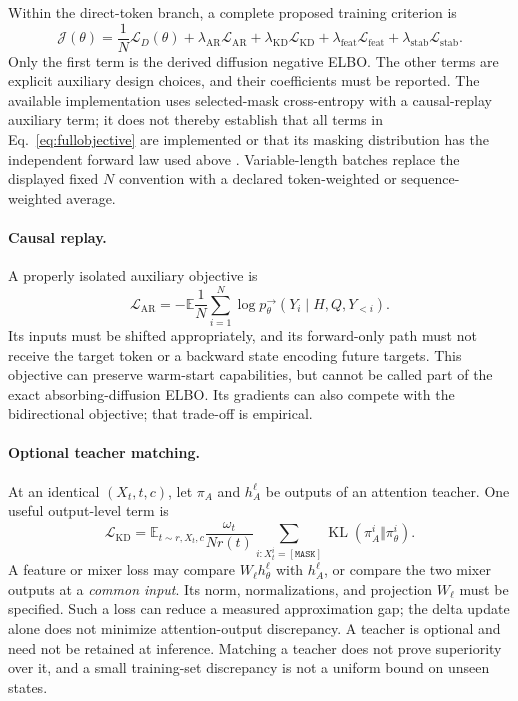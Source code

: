 \documentclass{article}
\theoremstyle{remark}\newtheorem{remark}[theorem]{Remark}
\newcommand{\E}{\mathbb E}
\newcommand{\KL}{\operatorname{KL}}
\newcommand{\mask}{\mathtt{[MASK]}}
\begin{document}
Within the direct-token branch, a complete proposed training criterion is
\begin{equation}
 \mathcal J(\theta)=\frac{1}{N}\mathcal L_D(\theta)
 +\lambda_{\mathrm{AR}}\mathcal L_{\mathrm{AR}}
 +\lambda_{\mathrm{KD}}\mathcal L_{\mathrm{KD}}
 +\lambda_{\mathrm{feat}}\mathcal L_{\mathrm{feat}}
 +\lambda_{\mathrm{stab}}\mathcal L_{\mathrm{stab}}.
 \label{eq:fullobjective}
\end{equation}
Only the first term is the derived diffusion negative ELBO. The other terms are explicit auxiliary design choices, and their coefficients must be reported. The available implementation uses selected-mask cross-entropy with a causal-replay auxiliary term; it does not thereby establish that all terms in Eq.~\eqref{eq:fullobjective} are implemented or that its masking distribution has the independent forward law used above \cite{repo}. Variable-length batches replace the displayed fixed $N$ convention with a declared token-weighted or sequence-weighted average.

\paragraph{Causal replay.}
A properly isolated auxiliary objective is
\begin{equation}
 \mathcal L_{\mathrm{AR}}=-\E\frac1N\sum_{i=1}^N
 \log p_\theta^{\to}(Y_i\mid H,Q,Y_{<i}).
\end{equation}
Its inputs must be shifted appropriately, and its forward-only path must not receive the target token or a backward state encoding future targets. This objective can preserve warm-start capabilities, but cannot be called part of the exact absorbing-diffusion ELBO. Its gradients can also compete with the bidirectional objective; that trade-off is empirical.

\paragraph{Optional teacher matching.}
At an identical $(X_t,t,c)$, let $\pi_A$ and $h_A^\ell$ be outputs of an attention teacher. One useful output-level term is
\begin{equation}
 \mathcal L_{\mathrm{KD}}=\E_{t\sim r,X_t,c}\frac{\omega_t}{Nr(t)}
 \sum_{i:X_t^i=\mask}\KL(\pi_A^i\Vert\pi_\theta^i).
 \label{eq:distillation}
\end{equation}
A feature or mixer loss may compare $W_\ell h_\theta^\ell$ with $h_A^\ell$, or compare the two mixer outputs at a \emph{common input}. Its norm, normalizations, and projection $W_\ell$ must be specified. Such a loss can reduce a measured approximation gap; the delta update alone does not minimize attention-output discrepancy. A teacher is optional and need not be retained at inference. Matching a teacher does not prove superiority over it, and a small training-set discrepancy is not a uniform bound on unseen states.
\end{document}
